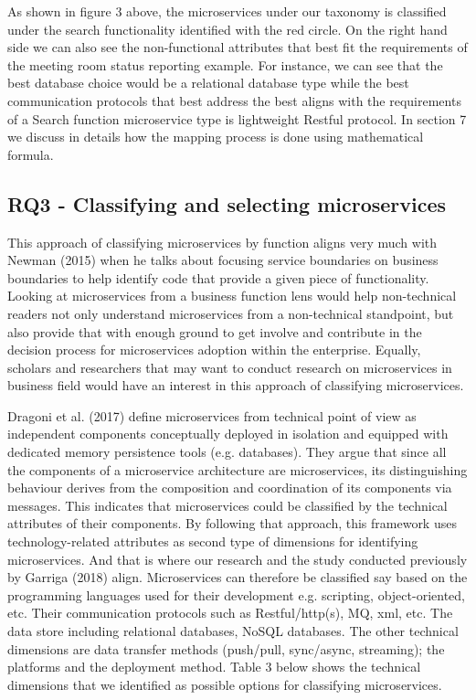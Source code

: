\documentclass{article}
\begin{document}
As shown in figure 3 above, the microservices under our taxonomy is classified under the search functionality identified with the red circle. On the right hand side we can also see the non-functional attributes that best fit the requirements of the meeting room status reporting example. For instance, we can see that the best database choice would be a relational database type while the best communication protocols that best address the best aligns with the requirements of a Search function microservice type is lightweight Restful protocol. In section 7 we discuss in details how the mapping process is done using mathematical formula.

\subsection{RQ3 - Classifying and selecting microservices}

This approach of classifying microservices by function aligns very much with Newman (2015) when he talks about focusing service boundaries on business boundaries to help identify code that provide a given piece of functionality. Looking at microservices from a business function lens would help non-technical readers not only understand microservices from a non-technical standpoint, but also provide that with enough ground to get involve and contribute in the decision process for microservices adoption within the enterprise. Equally, scholars and researchers that may want to conduct research on microservices in business field would have an interest in this approach of classifying microservices.

Dragoni et al. (2017) define microservices from technical point of view as independent components conceptually deployed in isolation and equipped with dedicated memory persistence tools (e.g. databases). They argue that since all the components of a microservice architecture are microservices, its distinguishing behaviour derives from the composition and coordination of its components via messages. This indicates that microservices could be classified by the technical attributes of their components. By following that approach, this framework uses technology-related attributes as second type of dimensions for identifying microservices. And that is where our research and the study conducted previously by Garriga (2018) align. Microservices can therefore be classified say based on the programming languages used for their development e.g. scripting, object-oriented, etc. Their communication protocols such as Restful/http(s), MQ, xml, etc. The data store including relational databases, NoSQL databases. The other technical dimensions are data transfer methods (push/pull, sync/async, streaming); the platforms and the deployment method. Table 3 below shows the technical dimensions that we identified as possible options for classifying microservices.
\end{document}
